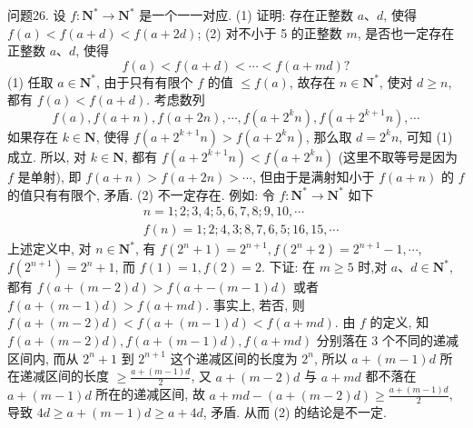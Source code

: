 问题26. 设 $f: \mathbf{N}^* \rightarrow \mathbf{N}^*$ 是一个一一对应.
(1) 证明: 存在正整数 $a 、 d$, 使得 $f(a)<f(a+d)<f(a+2 d)$;
(2) 对不小于 5 的正整数 $m$, 是否也一定存在正整数 $a 、 d$, 使得
$$
f(a)<f(a+d)<\cdots<f(a+m d) ?
$$
(1) 任取 $a \in \mathbf{N}^*$, 由于只有有限个 $f$ 的值 $\leqslant f(a)$, 故存在 $n \in \mathbf{N}^*$, 使对 $d \geqslant n$, 都有 $f(a)<f(a+d)$. 考虑数列
$$
f(a), f(a+n), f(a+2 n), \cdots, f\left(a+2^k n\right), f\left(a+2^{k+1} n\right), \cdots
$$
如果存在 $k \in \mathbf{N}$, 使得 $f\left(a+2^{k+1} n\right)>f\left(a+2^k n\right)$, 那么取 $d=2^k n$, 可知 (1) 成立.
所以, 对 $k \in \mathbf{N}$, 都有 $f\left(a+2^{k+1} n\right)<f\left(a+2^k n\right)$ (这里不取等号是因为 $f$ 是单射), 即 $f(a+n)>f(a+2 n)>\cdots$, 但由于是满射知小于 $f(a+n)$ 的 $f$ 的值只有有限个, 矛盾.
(2) 不一定存在.
例如: 令 $f: \mathbf{N}^* \rightarrow \mathbf{N}^*$ 如下
$$
\begin{aligned}
& n=1 ; 2 ; 3,4 ; 5,6,7,8 ; 9,10, \cdots \\
& f(n)=1 ; 2 ; 4,3 ; 8,7,6,5 ; 16,15, \cdots
\end{aligned}
$$
上述定义中, 对 $n \in \mathbf{N}^*$, 有 $f\left(2^n+1\right)=2^{n+1}, f\left(2^n+2\right)=2^{n+1}-1, \cdots$, $f\left(2^{n+1}\right)=2^n+1$, 而 $f(1)=1, f(2)=2$.
下证: 在 $m \geqslant 5$ 时,对 $a 、 d \in \mathbf{N}^*$, 都有 $f(a+(m-2) d)>f(a+-(m- 1) d)$ 或者 $f(a+(m-1) d)>f(a+m d)$.
事实上, 若否, 则 $f(a+(m-2) d)<f(a+(m-1) d)<f(a+m d)$. 由 $f$ 的定义, 知 $f(a+(m-2) d), f(a+(m-1) d), f(a+m d)$ 分别落在 3 个不同的递减区间内, 而从 $2^n+1$ 到 $2^{n+1}$ 这个递减区间的长度为 $2^n$, 所以 $a+ (m-1) d$ 所在递减区间的长度 $\geqslant \frac{a+(m-1) d}{2}$, 又 $a+(m-2) d$ 与 $a+m d$ 都不落在 $a+(m-1) d$ 所在的递减区间, 故 $a+m d-(a+(m-2) d) \geqslant \frac{a+(m-1) d}{2}$, 导致 $4 d \geqslant a+(m-1) d \geqslant a+4 d$, 矛盾.
从而 (2) 的结论是不一定.



